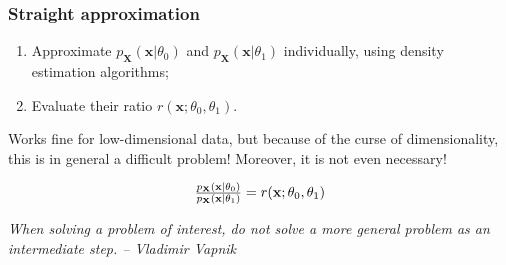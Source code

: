 \documentclass{beamer}
\newcommand{\mathnode}[2]{%
  \mathord{\tikz[baseline=(#1.base), inner sep = 0pt]{\node (#1) {$#2$};}}}
\begin{document}
\begin{frame}[fragile]
    \frametitle{Straight approximation}

    \begin{enumerate}
        \item Approximate $p_\mathbf{X}(\mathbf{x}|\theta_0)$ and $p_\mathbf{X}(\mathbf{x}|\theta_1)$ individually, using density estimation algorithms;
        \item Evaluate their ratio $r(\mathbf{x};\theta_0,\theta_1)$.
    \end{enumerate}

    \vspace{1em}

    Works fine for low-dimensional data, but because of the curse of dimensionality, this is in general a difficult problem! Moreover, {\color{red} it is not even necessary}!

    $$
      \mathnode{A}{  \frac{ p_\mathbf{X}(\mathbf{x}|\theta_0)}{ p_\mathbf{X}(\mathbf{x}|\theta_1)} } = \mathnode{B}{ r(\mathbf{x};\theta_0,\theta_1)}
    $$


    \vspace{1em}

    {\small \centering \it When solving a problem of interest, do not solve a more general problem as an intermediate step. -- Vladimir Vapnik}

\end{frame}
\end{document}
